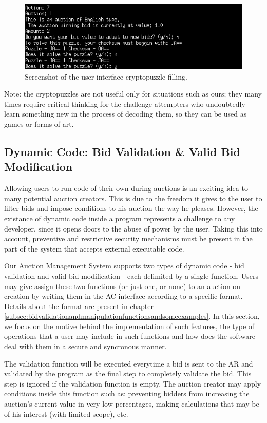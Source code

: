 \documentclass[a4paper]{article}
\begin{document}
\begin{figure}[H]
\centering
\includegraphics[width=0.8\linewidth]{CP.png}
\caption{Screenshot of the user interface cryptopuzzle filling.}
\label{fig:cp}
\end{figure}

Note: the cryptopuzzles are not useful only for situations such as ours; they many times require critical thinking for the challenge attempters who undoubtedly learn something new in the process of decoding them, so they can be used as games or forms of art.

\subsection{Dynamic Code: Bid Validation \& Valid Bid Modification}
\label{subsec:dynamiccode}

Allowing users to run code of their own during auctions is an exciting idea to many potential auction creators.
This is due to the freedom it gives to the user to filter bids and impose conditions to his auction the way he pleases.
However, the existance of dynamic code inside a program represents a challenge to any developer, since it opens doors to the abuse of power by the user.
Taking this into account, preventive and restrictive security mechanisms must be present in the part of the system that accepts external executable code.

Our Auction Management System supports two types of dynamic code - bid validation and valid bid modification - each delimited by a single function.
Users may give assign these two functions (or just one, or none) to an auction on creation by writing them in the AC interface according to a specific format.
Details about the format are present in chapter \ref{subsec:bidvalidationandmanipulationfunctionsandsomeexamples}.
In this section, we focus on the motive behind the implementation of such features, the type of operations that a user may include in such functions and how does the software deal with them in a secure and syncronous manner.

The validation function will be executed everytime a bid is sent to the AR and validated by the program as the final step to completely validate the bid. This step is ignored if the validation function is empty. 
The auction creator may apply conditions inside this function such as: preventing bidders from increasing the auction's current value in very low percentages, making calculations that may be of his interest (with limited scope), etc.
\end{document}
